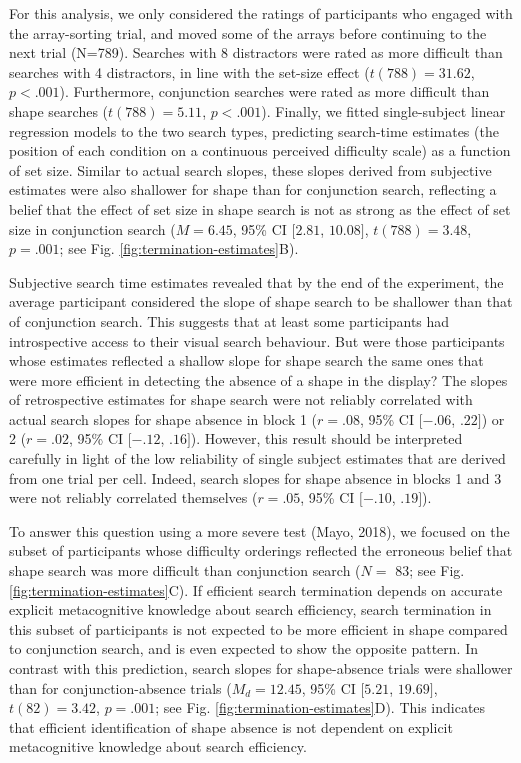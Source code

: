 \documentclass[12pt,twoside]{reedthesis}
\begin{document}
For this analysis, we only considered the ratings of participants who engaged with the array-sorting trial, and moved some of the arrays before continuing to the next trial (N=789). Searches with 8 distractors were rated as more difficult than searches with 4 distractors, in line with the set-size effect (\(t(788) = 31.62\), \(p < .001\)). Furthermore, conjunction searches were rated as more difficult than shape searches (\(t(788) = 5.11\), \(p < .001\)). Finally, we fitted single-subject linear regression models to the two search types, predicting search-time estimates (the position of each condition on a continuous perceived difficulty scale) as a function of set size. Similar to actual search slopes, these slopes derived from subjective estimates were also shallower for shape than for conjunction search, reflecting a belief that the effect of set size in shape search is not as strong as the effect of set size in conjunction search (\(M = 6.45\), 95\% CI \([2.81\), \(10.08]\), \(t(788) = 3.48\), \(p = .001\); see Fig. \ref{fig:termination-estimates}B).

Subjective search time estimates revealed that by the end of the experiment, the average participant considered the slope of shape search to be shallower than that of conjunction search. This suggests that at least some participants had introspective access to their visual search behaviour. But were those participants whose estimates reflected a shallow slope for shape search the same ones that were more efficient in detecting the absence of a shape in the display? The slopes of retrospective estimates for shape search were not reliably correlated with actual search slopes for shape absence in block 1 (\(r = .08\), 95\% CI \([-.06\), \(.22]\)) or 2 (\(r = .02\), 95\% CI \([-.12\), \(.16]\)). However, this result should be interpreted carefully in light of the low reliability of single subject estimates that are derived from one trial per cell. Indeed, search slopes for shape absence in blocks 1 and 3 were not reliably correlated themselves (\(r = .05\), 95\% CI \([-.10\), \(.19]\)).

To answer this question using a more severe test (Mayo, 2018), we focused on the subset of participants whose difficulty orderings reflected the erroneous belief that shape search was more difficult than conjunction search (\(N=\) 83; see Fig. \ref{fig:termination-estimates}C). If efficient search termination depends on accurate explicit metacognitive knowledge about search efficiency, search termination in this subset of participants is not expected to be more efficient in shape compared to conjunction search, and is even expected to show the opposite pattern. In contrast with this prediction, search slopes for shape-absence trials were shallower than for conjunction-absence trials (\(M_d = 12.45\), 95\% CI \([5.21\), \(19.69]\), \(t(82) = 3.42\), \(p = .001\); see Fig. \ref{fig:termination-estimates}D). This indicates that efficient identification of shape absence is not dependent on explicit metacognitive knowledge about search efficiency.
\end{document}
